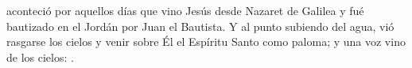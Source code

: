  aconteció por aquellos días que vino Jesús desde Nazaret de Galilea y fué bautizado en el Jordán por Juan el Bautista.
Y al punto subiendo del agua, vió rasgarse los cielos y venir sobre Él el Espíritu Santo como paloma; y una voz vino de los cielos:
. 
